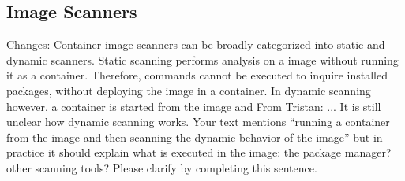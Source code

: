 \documentclass[a4paper,num-refs]{oup-contemporary}
\newcommand{\change}[2]{\color{cyan}Changes: #1\color{black}}
\newcommand{\tristan}[1]{\color{blue}From Tristan: #1\color{black}}
\begin{document}
%
%
%
%


\subsection{Image Scanners}

\change{Container image scanners can be broadly categorized into static and dynamic
scanners. Static scanning performs analysis on a image without running it
as a container. Therefore, commands cannot be executed to inquire installed packages}




\tristan{Does it really look into files, or only installed packages? Please check. The difference is important 
when software is installed without using the package manager.}, without deploying the image in a container. In
dynamic scanning however, a container is started from the image and
\tristan{... It is still unclear how dynamic scanning works. Your text
mentions ``running a container from the image and then scanning the dynamic
behavior of the image'' but in practice it should explain what is executed
in the image: the package manager? other scanning tools? Please clarify by
completing this sentence.}
\end{document}
